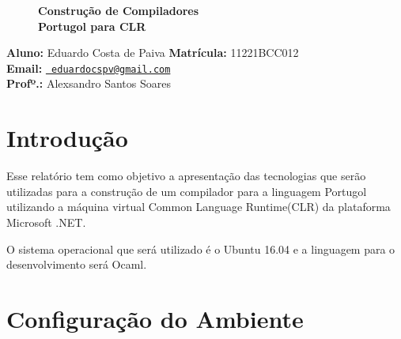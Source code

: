 \documentclass[hidelinks,12pt]{article}
\newcommand{\bigicon}[1]{\texttt{[image: \#1]}}
\begin{document}
\pagestyle{fancy}


\lhead{\bigicon{Figures/ufu}}
\rhead{\bigicon{Figures/facom}}
\lfoot{}
\cfoot{}
\rfoot{}
\vspace*{8.5cm}
\begin{figure}[!h]
	\centering
	\Huge{\bf {Construção de Compiladores\\ Portugol para CLR}}
\end{figure}

\vspace*{6cm}

\noindent\textbf{Aluno:} Eduardo Costa de Paiva \qquad \textbf{Matrícula:} 11221BCC012 \\
\textbf{Email:} \texttt{\small \url{ eduardocspv@gmail.com}}\\
\textbf{Profº.:} Alexsandro Santos Soares


\newpage
\fancyhead[C]{}
\fancyhead[R]{}
\fancyhead[L]{\leftmark}
\fancyfoot{}
\fancyfoot[C]{\hspace{1.5cm}\thepage}


{\let\thefootnote\relax{}}

\newpage

\tableofcontents


\newpage

\section{Introdução}

	Esse relatório tem como objetivo a apresentação das tecnologias que serão utilizadas para a construção de um compilador para a linguagem Portugol utilizando a máquina virtual Common Language Runtime(CLR) da plataforma Microsoft .NET. 
	
	O sistema operacional que será utilizado é o Ubuntu 16.04 e a linguagem para o desenvolvimento será Ocaml.
	
	
\section{Configuração do Ambiente}
\end{document}
